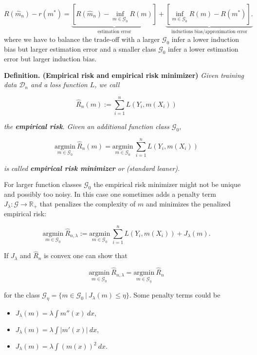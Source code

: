\documentclass[a4paper,10pt,openany]{book}
\providecommand{\tightlist}{%
 \setlength{\itemsep}{0pt}\setlength{\parskip}{0pt}}
\begin{document}
\[
R(\hat{m}_n)-r(m^*)=\underbrace{\left[R(\hat{m}_n)-\inf_{m\in\mathcal{G}_0}R(m)\right]}_{\text{estimation error}}+\underbrace{\left[\inf_{m\in\mathcal{G}_0}R(m)-R(m^*)\right].}_{\text{inductions bias/approximation error}}
\]
where we have to balance the trade-off with a larger \(\mathcal{G}_0\) infer a lower induction bias but larger estimation error and a smaller class \(\mathcal{G}_0\) infer a lower estimation error but larger induction bias.

\textbf{Definition. (Empirical risk and empirical risk minimizer)} \emph{Given training data \(\mathcal{D}_n\) and a loss function \(L\), we call}

\[
\hat{R}_n(m):=\sum_{i=1}^nL(Y_i,m(X_i))
\]

\emph{the \textbf{empirical risk}. Given an additional function class \(\mathcal{G}_0\),}

\[
\underset{m\in\mathcal{G}_0}{\text{argmin}}\ \hat{R}_n(m)=\underset{m\in\mathcal{G}_0}{\text{argmin}}\ \sum_{i=1}^nL(Y_i,m(X_i))
\]

\emph{is called \textbf{empirical risk minimizer} or (standard leaner).}

For larger function classes \(\mathcal{G}_0\) the empirical risk minimizer might not be unique and possibly too noisy. In this case one sometimes adds a penalty term \(J_\lambda : \mathcal{G}\to \mathbb{R}_+\) that penalizes the complexity of \(m\) and minimizes the penalized empirical risk:

\[
\underset{m\in\mathcal{G}_0}{\text{argmin}}\ \hat{R}_{n,\lambda}:=\underset{m\in\mathcal{G}_0}{\text{argmin}}\ \sum_{i=1}^nL(Y_i,m(X_i)) + J_\lambda(m).
\]

If \(J_\lambda\) and \(\hat{R}_n\) is convex one can show that

\[
\underset{m\in\mathcal{G}_0}{\text{argmin}}\ \hat{R}_{n,\lambda}=\underset{m\in\mathcal{G}_\eta}{\text{argmin}}\ \hat{R}_{n}
\]

for the class \(\mathcal{G}_\eta=\{m\in \mathcal{G}_0\ \vert\ J_\lambda(m)\le \eta\}\). Some penalty terms could be

\begin{itemize}
\tightlist
\item
  \(J_\lambda(m)=\lambda\int m''(x)\ dx\),
\item
  \(J_\lambda(m)=\lambda \int\vert m'(x)\vert\ dx\),
\item
  \(J_\lambda(m)=\lambda \int(m(x))^2\ dx\).
\end{itemize}
\end{document}
